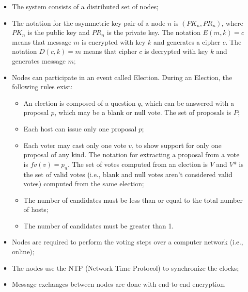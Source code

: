 \documentclass[english]{textolivre}
\begin{document}
\begin{itemize}

\item The system consists of a distributed set of nodes;

\item The notation for the asymmetric key pair of a node $n$ is $(PK_{n}, PR_{n})$, where $PK_{n}$ is the public key and $PR_{n}$ is the private key. The notation $E(m, k) = c$ means that message $m$ is encrypted with key $k$ and generates a cipher $c$. The notation $D(c, k) = m$ means that cipher $c$ is decrypted with key $k$ and generates message $m$;

\item Nodes can participate in an event called Election. During an Election, the following rules exist:

\begin{itemize}

\item An election is composed of a question $q$, which can be answered with a proposal $p$, which may be a blank or null vote. The set of proposals is $P$;

\item Each host can issue only one proposal $p$;

\item Each voter may cast only one vote $v$, to show support for only one proposal of any kind. The notation for extracting a proposal from a vote is $fv(v) = p_{n}$. The set of votes computed from an election is $V$ and $V$* is the set of valid votes (i.e., blank and null votes aren't considered valid votes) computed from the same election;

\item The number of candidates must be less than or equal to the total number of hosts;

\item The number of candidates must be greater than 1.

\end{itemize}

\item Nodes are required to perform the voting steps over a computer network (i.e., online);

\item The nodes use the NTP (Network Time Protocol) to synchronize the clocks;

\item Message exchanges between nodes are done with end-to-end encryption.

\end{itemize}
\end{document}
